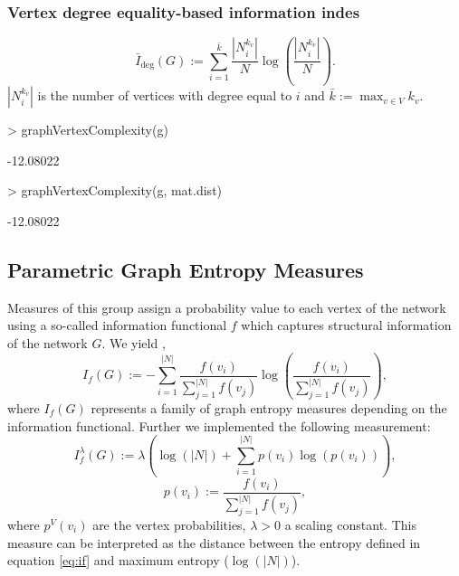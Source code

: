 \documentclass[a4paper]{article}
\begin{document}
\subsubsection*{Vertex degree equality-based information indes}
\begin{equation}
\bar{I}_{\text{deg}}(G) := \sum_{i=1}^{\bar{k}} \frac{|N^{k_v}_i|}{N} \log \left( \frac{|N^{k_v}_i|}{N} \right).
\end{equation}
%
$|N^{k_v}_i|$ is the number of vertices with degree equal to $i$ and $\bar{k}:= \max_{v\in V}k_v$.
\begin{Schunk}
\begin{Sinput}
> graphVertexComplexity(g)
\end{Sinput}
\begin{Soutput}
[1] -12.08022
\end{Soutput}
\begin{Sinput}
> graphVertexComplexity(g, mat.dist)
\end{Sinput}
\begin{Soutput}
[1] -12.08022
\end{Soutput}
\end{Schunk}

\subsection{Parametric Graph Entropy Measures}
\label{sec:dE}
Measures of this group \cite{dehmer_functionals_2008,dehmer_varmuza_2009} assign a probability value to each vertex of the network using a so-called information functional $f$
which captures structural information of the network $G$. We yield \cite{dehmer_functionals_2008},
\begin{equation}\label{eq:if}
I_{f}(G):=-\sum_{i=1}^{|N|}{\frac{f(v_i)}{\sum_{j=1}^{|N|}f(v_j)} \log\left(\frac{f(v_i)}{\sum_{j=1}^{|N|}f(v_j)}\right)},
\end{equation}
%
where $I_{f}(G)$ represents a family of graph entropy \cite{dehmer_functionals_2008} measures depending on the information functional.
Further we implemented the following measurement\cite{dehmer_varmuza_2009}:
\begin{equation}\label{eq:dist}
I^{\lambda}_{f}(G) := \lambda \left( \log(|N|) + \sum_{i=1}^{|N|}{p(v_i)\log(p(v_i))} \right),
\end{equation}
\begin{equation}\label{eq:pis}
p(v_i):={\frac{f(v_i)}{\sum_{j=1}^{|N|}f(v_j)}},
\end{equation}
where $p^V(v_i)$ are the vertex probabilities, $\lambda > 0$ a scaling constant. This measure can be interpreted as the distance between the entropy defined in equation \ref{eq:if} and maximum entropy ($\log(|N|)$).
\end{document}
